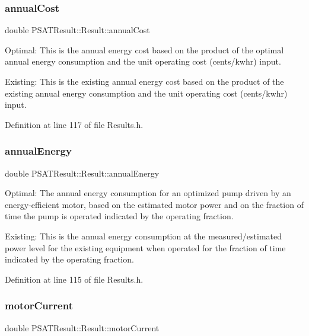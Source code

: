 \subsubsection{\texorpdfstring{annual\+Cost}{annualCost}}
{\footnotesize\ttfamily double P\+S\+A\+T\+Result\+::\+Result\+::annual\+Cost}



Optimal\+: This is the annual energy cost based on the product of the optimal annual energy consumption and the unit operating cost (cents/kwhr) input. 

Existing\+: This is the existing annual energy cost based on the product of the existing annual energy consumption and the unit operating cost (cents/kwhr) input. 

Definition at line 117 of file Results.\+h.

\mbox{\label{struct_p_s_a_t_result_1_1_result_aadbf128fb74140ef7117fbac7d3f16e5}} 
\subsubsection{\texorpdfstring{annual\+Energy}{annualEnergy}}
{\footnotesize\ttfamily double P\+S\+A\+T\+Result\+::\+Result\+::annual\+Energy}



Optimal\+: The annual energy consumption for an optimized pump driven by an energy-\/efficient motor, based on the estimated motor power and on the fraction of time the pump is operated indicated by the operating fraction. 

Existing\+: This is the annual energy consumption at the measured/estimated power level for the existing equipment when operated for the fraction of time indicated by the operating fraction. 

Definition at line 115 of file Results.\+h.

\mbox{\label{struct_p_s_a_t_result_1_1_result_a49d9fcc148cd66e507b918dea7435f1d}} 
\subsubsection{\texorpdfstring{motor\+Current}{motorCurrent}}
{\footnotesize\ttfamily double P\+S\+A\+T\+Result\+::\+Result\+::motor\+Current}



